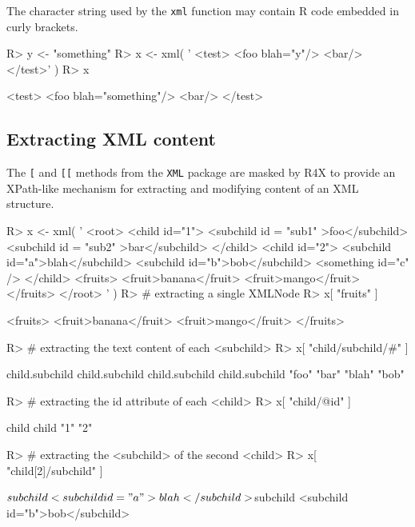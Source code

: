 \documentclass[a4paper,10pt]{article}
\begin{document}
The character string used by the \texttt{xml} function may contain R code embedded in curly brackets.

\begin{Schunk}
\begin{Sinput}
R> y <- "something"
R> x <- xml( '
     <test>
        <foo blah="{y}"/>
        <bar/>
     </test>' ) 
R> x
\end{Sinput}
\begin{Soutput}
<test>
 <foo blah="something"/>
 <bar/>
</test>
\end{Soutput}
\end{Schunk}

\subsection*{Extracting XML content}

The \texttt{[} and \texttt{[[} methods from the \texttt{XML} package are masked by R4X to 
provide an XPath-like mechanism for extracting and modifying content of an XML structure.

\begin{Schunk}
\begin{Sinput}
R> x <- xml( '
   <root>
     <child id="1">
       <subchild id = "sub1" >foo</subchild>
       <subchild id = "sub2" >bar</subchild>
     </child>
     <child id="2">
       <subchild id="a">blah</subchild>
       <subchild id="b">bob</subchild>
       <something id="c" />
     </child>
     <fruits>
        <fruit>banana</fruit>
        <fruit>mango</fruit>
     </fruits>
   </root>  
   ' )
R> # extracting a single XMLNode
R> x[ "fruits" ]   
\end{Sinput}
\begin{Soutput}
<fruits>
 <fruit>banana</fruit>
 <fruit>mango</fruit>
</fruits>
\end{Soutput}
\begin{Sinput}
R> # extracting the text content of each <subchild>
R> x[ "child/subchild/#" ]  
\end{Sinput}
\begin{Soutput}
child.subchild child.subchild child.subchild child.subchild 
         "foo"          "bar"         "blah"          "bob" 
\end{Soutput}
\begin{Sinput}
R> # extracting the id attribute of each <child>
R> x[ "child/@id" ]   
\end{Sinput}
\begin{Soutput}
child child 
  "1"   "2" 
\end{Soutput}
\begin{Sinput}
R> # extracting the <subchild> of the second <child>
R> x[ "child[2]/subchild" ]      
\end{Sinput}
\begin{Soutput}
$subchild
<subchild id="a">blah</subchild>

$subchild
<subchild id="b">bob</subchild>
\end{Soutput}
\end{Schunk}
\end{document}
